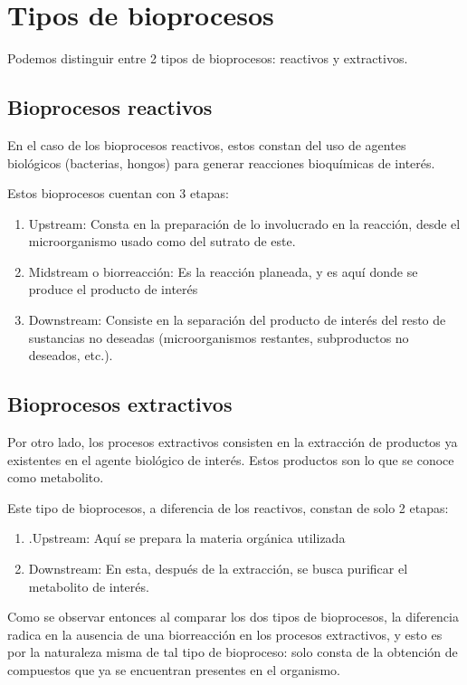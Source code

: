 



\section{Tipos de bioprocesos}

Podemos distinguir entre 2 tipos de bioprocesos: reactivos y extractivos.

\subsection{Bioprocesos reactivos}

En el caso de los bioprocesos reactivos, estos constan del uso de agentes biológicos (bacterias, hongos) para generar reacciones bioquímicas de interés.

Estos bioprocesos cuentan con 3 etapas:

\begin{enumerate}
    \item Upstream: Consta en la preparación de lo involucrado en la reacción, desde el microorganismo usado como del sutrato de este.
    \item Midstream o biorreacción: Es la reacción planeada, y es aquí donde se produce el producto de interés
    \item Downstream: Consiste en la separación del producto de interés del resto de sustancias no deseadas (microorganismos restantes, subproductos no deseados, etc.).
\end{enumerate}

\subsection{Bioprocesos extractivos}

Por otro lado, los procesos extractivos consisten en la extracción de productos ya existentes en el agente biológico de interés. Estos productos son lo que se conoce como metabolito.

Este tipo de bioprocesos, a diferencia de los reactivos, constan de solo 2 etapas:

\begin{enumerate}
    \item .Upstream: Aquí se prepara la materia orgánica utilizada
    \item Downstream: En esta, después de la extracción, se busca purificar el metabolito de interés.
\end{enumerate}

Como se observar entonces al comparar los dos tipos de bioprocesos, la diferencia radica en la ausencia de una biorreacción en los procesos extractivos, y esto es por la naturaleza misma de tal tipo de bioproceso: solo consta de la obtención de compuestos que ya se encuentran presentes en el organismo.

